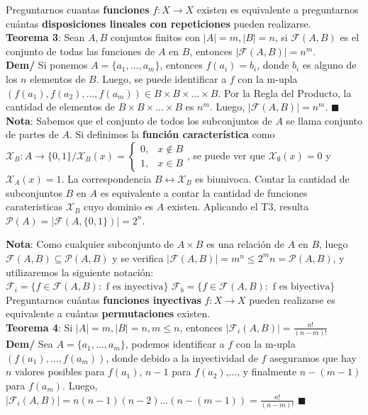 \documentclass[11pt,a4paper]{article}
\newcommand*{\QEDA}{\null\nobreak\hfill\ensuremath{\blacksquare}}
\begin{document}
\newpage

\noindent Preguntarnos cuantas \textbf{funciones} $f: X \rightarrow X$ existen es equivalente a preguntarnos cuántas \textbf{disposiciones lineales con repeticiones} pueden realizarse.\\
\textbf{Teorema 3}: Sean $A,B$ conjuntos finitos con $|A|=m, |B|=n$, si $\mathcal{F}(A,B)$ es el conjunto de todas las funciones de $A$ en $B$, entonces $|\mathcal{F}(A,B)| = n^m$.\\
\textbf{Dem/} Si ponemos $A = \{a_1,...,a_m\}$, entonces $f(a_i) = b_i$, donde $b_i$ es alguno de los $n$ elementos de $B$. Luego, se puede identificar a $f$ con la m-upla $(f(a_1),f(a_2),...,f(a_m)) \in B \times B \times ... \times B$. Por la Regla del Producto, la cantidad de elementos de $B \times B \times ... \times B$ es $n^m$. Luego, $|\mathcal{F}(A,B)| = n^m$. \QEDA\\

{
\renewcommand{\arraystretch}{.5}
\noindent \textbf{Nota}: Sabemos que el conjunto de todos los subconjuntos de $A$ se llama conjunto de partes de $A$. Si definimos la \textbf{funci\'on caracter\'istica} como $\mathcal{X}_B : A \rightarrow\{0,1\} / \mathcal{X}_B(x) = \left\{\begin{array}{ll} 0, & x \not \in B \\ 1, & x \in B\end{array}\right.$, se puede ver que $\mathcal{X}_\emptyset(x) = 0$ y $\mathcal{X}_A(x) = 1$. La correspondencia $B \leftrightarrow \mathcal{X}_B$ es biunivoca. Contar la cantidad de subconjuntos $B$ en $A$ es equivalente a contar la cantidad de funciones carateristicas $\mathcal{X}_B$ cuyo dominio es $A$ existen. Aplicando el T3, resulta $\mathcal{P}(A) = |\mathcal{F}(A,\{0,1\})| = 2^n$.\\
}

\noindent \textbf{Nota}: Como cualquier subconjunto de $A \times B$ es una relaci\'on de $A$ en $B$, luego $\mathcal{F}(A, B) \subseteq \mathcal{P}(A, B)$ y se verifica $|\mathcal{F}(A,B)| = m^n \leq 2^mn = \mathcal{P}(A, B)$, y utilizaremos la siguiente notaci\'on:\\
$\mathcal{F}_i = \{f \in \mathcal{F}(A,B) : \text{ f es inyectiva}\}$ \hfill $\mathcal{F}_b = \{f \in \mathcal{F}(A,B) : \text{ f es biyectiva}\}$\\


\noindent Preguntarnos cuántas \textbf{funciones inyectivas} $f : X \rightarrow X$ pueden realizarse es equivalente a cuántas \textbf{permutaciones} existen.\\
\textbf{Teorema 4}: Si $|A| = m, |B| = n, m \leq n$, entonces $|\mathcal{F}_i(A,B)| = \frac{n!}{(n-m)!}$\\
\textbf{Dem/} Sea $A=\{a_1,...,a_m\}$, podemos identificar a $f$ con la m-upla $(f(a_1),...,f(a_m))$, donde debido a la inyectividad de $f$ aseguramos que hay $n$ valores posibles para $f(a_1)$, $n-1$ para $f(a_2)$,..., y finalmente $n-(m-1)$ para $f(a_m)$. Luego, $|\mathcal{F}_i(A,B)| = n (n-1) (n-2)...(n-(m-1)) = \frac{n!}{(n-m)!}$ \QEDA\\
\end{document}

